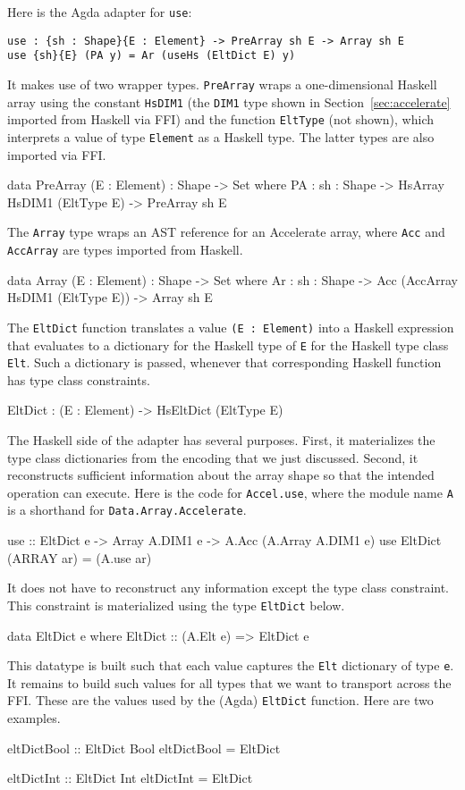 \documentclass{llncs}
\begin{document}
Here is the Agda adapter for \texttt{use}:
\begin{verbatim}
use : {sh : Shape}{E : Element} -> PreArray sh E -> Array sh E
use {sh}{E} (PA y) = Ar (useHs (EltDict E) y)
\end{verbatim}
It makes use of two wrapper types. \texttt{PreArray} wraps a
one-dimensional Haskell array using the constant \texttt{HsDIM1} (the
\texttt{DIM1} type shown in Section~\ref{sec:accelerate} imported from
Haskell via FFI) and the function \texttt{EltType} (not shown), which
interprets a value of type \texttt{Element} as a Haskell type. The
latter types are also imported via FFI.
\begin{code}
data PreArray (E : Element) : Shape -> Set where
  PA : {sh : Shape} -> HsArray HsDIM1 (EltType E) -> PreArray sh E
\end{code}
The \texttt{Array} type wraps an AST reference for an Accelerate
array, where \texttt{Acc} and \texttt{AccArray} are types imported
from Haskell.
\begin{code}
data Array (E : Element) : Shape -> Set where
  Ar : {sh : Shape} -> Acc (AccArray HsDIM1 (EltType E)) -> Array sh E
\end{code}
The \texttt{EltDict} function translates a value 
\texttt{(E : Element)} into a Haskell expression that evaluates to a
dictionary for the Haskell type of \texttt{E} for the Haskell type
class \texttt{Elt}. Such a dictionary is passed, whenever that
corresponding Haskell function has type class constraints.
\begin{code}
EltDict : (E : Element) -> HsEltDict (EltType E)
\end{code}

The Haskell side of the adapter has several purposes. First, it
materializes the type class dictionaries from the encoding that we
just discussed. Second, it reconstructs sufficient information about
the array shape so that the intended operation can execute. Here is
the code for \texttt{Accel.use}, where the module name \texttt{A}
is a shorthand for \texttt{Data.Array.Accelerate}.
\begin{hcode}
use :: EltDict e -> Array A.DIM1 e -> A.Acc (A.Array A.DIM1 e)
use EltDict (ARRAY ar) = (A.use ar)
\end{hcode}
It does not have to reconstruct any information except the type class
constraint. This constraint is materialized using the type
\texttt{EltDict} below.
\begin{hcode}
data EltDict e where
  EltDict :: (A.Elt e) => EltDict e
\end{hcode}
This datatype is built such that each value captures the \texttt{Elt}
dictionary of type \texttt{e}. It remains to build such values for all
types that we want to transport across the FFI. These are the values
used by the (Agda) \texttt{EltDict} function. Here are two examples.
\begin{hcode}
eltDictBool :: EltDict Bool
eltDictBool = EltDict

eltDictInt :: EltDict Int
eltDictInt = EltDict
\end{hcode}
\end{document}
